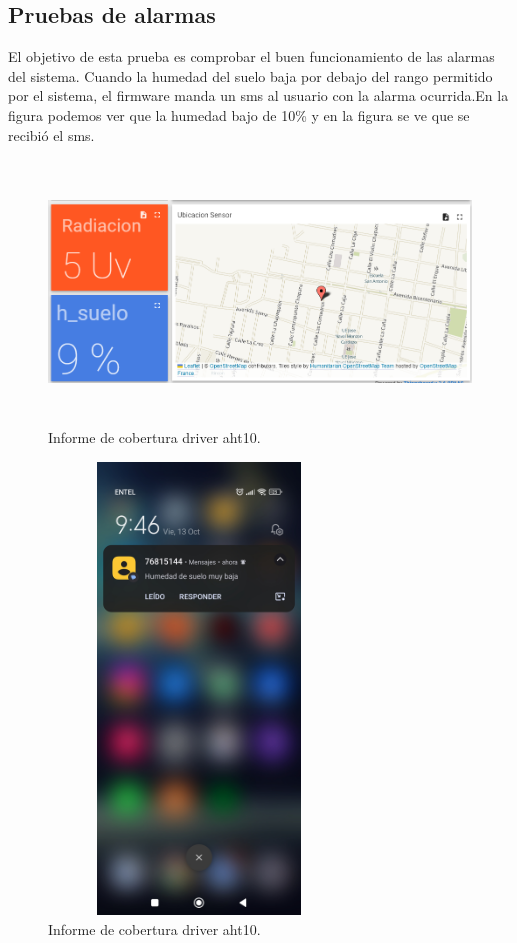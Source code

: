 \subsection{Pruebas de alarmas}
El objetivo de esta prueba es comprobar el buen funcionamiento de las alarmas del sistema.
Cuando la humedad del suelo baja por debajo del rango permitido por el sistema, el firmware manda un sms al usuario con la alarma ocurrida.En la figura podemos ver que la humedad bajo de 10\% y en la figura se ve que se recibió el sms.

\begin{figure}[h!]
  \centering
    \includegraphics[width=\linewidth, height=7cm]{./Figures/humedad_menor2.png}
  \caption{Informe de cobertura driver aht10.}
    \label{fig:humedad menor}
\end{figure}

\begin{figure}[h!]
  \centering
    \includegraphics[width=8cm, height=12cm]{./Figures/sms_alarma.jpg}
  \caption{Informe de cobertura driver aht10.}
    \label{fig:sms alarma}
\end{figure}

\label{sec:pruebasHW}


